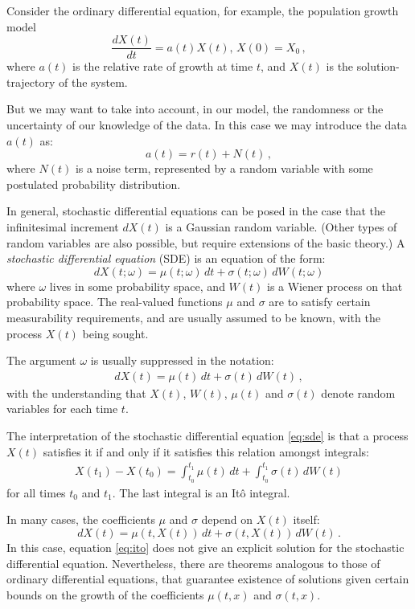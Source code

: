 \documentclass[12pt]{article}
\begin{document}

Consider the ordinary differential equation, for 
example, the population growth model 
\[
\frac{dX(t)}{dt}=a(t)X(t),\, X(0)=X_0\,,
\]
where $a(t)$ is the relative rate of growth at time $t$, and $X(t)$ 
is the solution-trajectory
of the system. 

But we may want to take into account, in our model, 
the randomness or the uncertainty 
of our knowledge of the data.
In this case we may introduce the data $a(t)$
as:
\[
a(t)=r(t)+ N(t)\,,
\]
where $N(t)$ is a noise term, represented by a random variable
with some postulated probability distribution.

In general, stochastic differential equations
can be posed in the case that the infinitesimal increment $dX(t)$
is a Gaussian random variable.  (Other types of random variables are 
also possible, but require extensions of the basic theory.)
A \emph{stochastic differential equation} (SDE) is an equation
of the form:
\[
dX(t; \omega) = \mu(t; \omega) \, dt + \sigma (t; \omega) \, dW(t; \omega)
\]
where $\omega$ lives in some probability space, and $W(t)$
is a Wiener process on that probability space.
The real-valued functions $\mu$ and $\sigma$ are to satisfy certain measurability requirements, and are usually assumed to be known, with the process $X(t)$ being sought.

The argument $\omega$ is usually suppressed in the notation:
\begin{align}\label{eq:sde}
dX(t) = \mu(t) \, dt + \sigma (t) \, dW(t)\,,
\end{align}
with the understanding that $X(t)$, $W(t)$, $\mu(t)$ and $\sigma(t)$ denote
random variables for each time $t$.

The interpretation of 
the stochastic differential equation \eqref{eq:sde} is that 
a process $X(t)$ satisfies it if and only if it satisfies
this relation amongst integrals:
\begin{align}\label{eq:ito}
X(t_1) - X(t_0) = \int_{t_0}^{t_1} \mu(t) \, dt
+ \int_{t_0}^{t_1} \sigma(t) \, dW(t)
\end{align}
for all times $t_0$ and $t_1$.
The last integral is an It\^o integral.

In many cases, the coefficients $\mu$ and $\sigma$
depend on $X(t)$ itself:
\[
dX(t) = \mu(t, X(t)) \, dt + \sigma(t, X(t)) \, dW(t)\,.
\]
In this case, equation \eqref{eq:ito} does not give
an explicit solution for the stochastic differential equation.
Nevertheless, there are theorems analogous to those
of ordinary differential equations,
that guarantee existence of solutions given certain 
bounds on the growth of the coefficients $\mu(t,x)$ and $\sigma(t,x)$.
\end{document}
